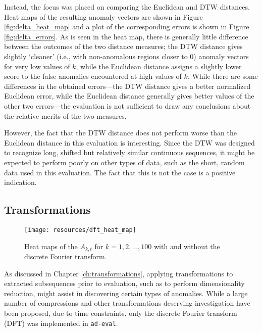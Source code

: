 Instead, the focus was placed on comparing the Euclidean and DTW distances. Heat maps of the resulting anomaly vectors are shown in Figure \ref{fig:delta_heat_map} and a plot of the corresponding errors is shown in Figure \ref{fig:delta_errors}. As is seen in the heat map, there is generally little difference between the outcomes of the two distance measures; the DTW distance gives slightly `cleaner' (i.e., with non-anomalous regions closer to $0$) anomaly vectors for very low values of $k$, while the Euclidean distance assigns a slightly lower score to the false anomalies encountered at high values of $k$. While there are some differences in the obtained errors---the DTW distance gives a better normalized Euclidean error, while the Euclidean distance generally gives better values of the other two errors---the evaluation is not sufficient to draw any conclusions about the relative merits of the two measures.

However, the fact that the DTW distance does not perform worse than the Euclidean distance in this evaluation is interesting. Since the DTW was designed to recognize long, shifted but relatively similar continuous sequences, it might be expected to perform poorly on other types of data, such as the short, random data used in this evaluation. The fact that this is not the case is a positive indication.

\clearpage

\subsection{Transformations}
\FloatBarrier

\begin{figure}[h]
    \vspace{-10pt}
    \begin{center}
        \texttt{[image: resources/dft\_heat\_map]}
    \end{center}
    \vspace{-20pt}
    \caption{\small{Heat maps of the $A_{k, t} $ for $k = 1,2,\dots,100$ with and without the discrete Fourier transform.}}
    \vspace{-10pt}
    \label{fig:dft_heat_map}
\end{figure}

As discussed in Chapter \ref{ch:transformations}, applying transformations to extracted subsequences prior to evaluation, such as to perform dimensionality reduction, might assist in discovering certain types of anomalies. While a large number of compressions and other transformations deserving investigation have been proposed, due to time constraints, only the discrete Fourier transform (DFT) was implemented in \texttt{ad-eval}.

